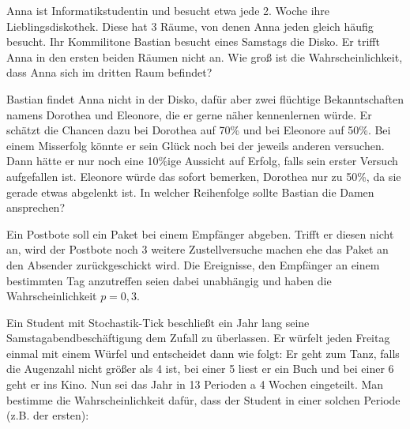\documentclass[10pt, a4paper]{exam}
\begin{document}
\begin{questions}
    \question Anna ist Informatikstudentin und besucht etwa jede 2. Woche ihre Lieblingsdiskothek. Diese hat 3 Räume, von denen Anna jeden gleich häufig besucht. Ihr Kommilitone Bastian besucht eines Samstags die Disko. Er trifft Anna in den ersten beiden Räumen nicht an. Wie groß ist die Wahrscheinlichkeit, dass Anna sich im dritten Raum befindet?

    \question Bastian findet Anna nicht in der Disko, dafür aber zwei flüchtige Bekanntschaften namens Dorothea und Eleonore, die er gerne näher kennenlernen würde. Er schätzt die Chancen dazu bei Dorothea auf 70\% und bei Eleonore auf 50\%. Bei einem Misserfolg könnte er sein Glück noch bei der jeweils anderen versuchen. Dann hätte er nur noch eine 10\%ige Aussicht auf Erfolg, falls sein erster Versuch aufgefallen ist. Eleonore würde das sofort bemerken, Dorothea nur zu 50\%, da sie gerade etwas abgelenkt ist. In welcher Reihenfolge sollte Bastian die Damen ansprechen?

    \question Ein Postbote soll ein Paket bei einem Empfänger abgeben. Trifft er diesen nicht an, wird der Postbote noch 3 weitere Zustellversuche machen ehe das Paket an den Absender zurückgeschickt wird. Die Ereignisse, den Empfänger an einem bestimmten Tag anzutreffen seien dabei unabhängig und haben die Wahrscheinlichkeit $p=0,3$.

    \question Ein Student mit Stochastik-Tick beschließt ein Jahr lang seine Samstagabendbeschäftigung dem Zufall zu überlassen. Er würfelt jeden Freitag einmal mit einem Würfel und entscheidet dann wie folgt: Er geht zum Tanz, falls die Augenzahl nicht größer als 4 ist, bei einer 5 liest er ein Buch und bei einer 6 geht er ins Kino. Nun sei das Jahr in 13 Perioden a 4 Wochen eingeteilt. Man bestimme die Wahrscheinlichkeit dafür, dass der Student in einer solchen Periode (z.B. der ersten):
\end{questions}
\end{document}
